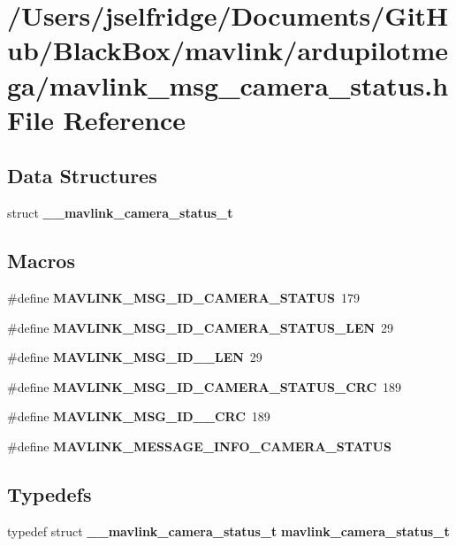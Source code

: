 \section{/\+Users/jselfridge/\+Documents/\+Git\+Hub/\+Black\+Box/mavlink/ardupilotmega/mavlink\+\_\+msg\+\_\+camera\+\_\+status.h File Reference}
\label{mavlink__msg__camera__status_8h}
\subsection*{Data Structures}
\begin{DoxyCompactItemize}
\item 
struct \textbf{ \+\_\+\+\_\+mavlink\+\_\+camera\+\_\+status\+\_\+t}
\end{DoxyCompactItemize}
\subsection*{Macros}
\begin{DoxyCompactItemize}
\item 
\#define \textbf{ M\+A\+V\+L\+I\+N\+K\+\_\+\+M\+S\+G\+\_\+\+I\+D\+\_\+\+C\+A\+M\+E\+R\+A\+\_\+\+S\+T\+A\+T\+US}~179
\item 
\#define \textbf{ M\+A\+V\+L\+I\+N\+K\+\_\+\+M\+S\+G\+\_\+\+I\+D\+\_\+\+C\+A\+M\+E\+R\+A\+\_\+\+S\+T\+A\+T\+U\+S\+\_\+\+L\+EN}~29
\item 
\#define \textbf{ M\+A\+V\+L\+I\+N\+K\+\_\+\+M\+S\+G\+\_\+\+I\+D\+\_\+\_\+\+L\+EN}~29
\item 
\#define \textbf{ M\+A\+V\+L\+I\+N\+K\+\_\+\+M\+S\+G\+\_\+\+I\+D\+\_\+\+C\+A\+M\+E\+R\+A\+\_\+\+S\+T\+A\+T\+U\+S\+\_\+\+C\+RC}~189
\item 
\#define \textbf{ M\+A\+V\+L\+I\+N\+K\+\_\+\+M\+S\+G\+\_\+\+I\+D\+\_\+\_\+\+C\+RC}~189
\item 
\#define \textbf{ M\+A\+V\+L\+I\+N\+K\+\_\+\+M\+E\+S\+S\+A\+G\+E\+\_\+\+I\+N\+F\+O\+\_\+\+C\+A\+M\+E\+R\+A\+\_\+\+S\+T\+A\+T\+US}
\end{DoxyCompactItemize}
\subsection*{Typedefs}
\begin{DoxyCompactItemize}
\item 
typedef struct \textbf{ \+\_\+\+\_\+mavlink\+\_\+camera\+\_\+status\+\_\+t} \textbf{ mavlink\+\_\+camera\+\_\+status\+\_\+t}
\end{DoxyCompactItemize}


